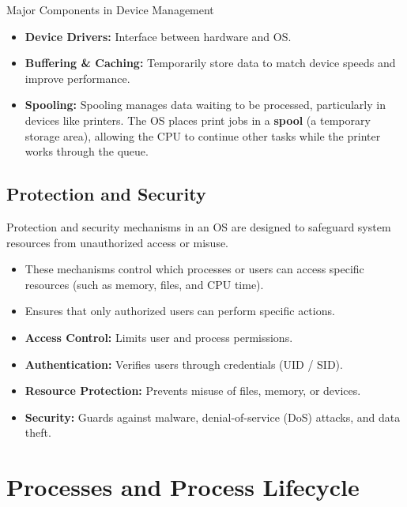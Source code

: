 \documentclass[10pt,a4paper]{article}
\begin{document}
\begin{conceptcard}{Major Components in Device Management}
\begin{itemize}
    \item \textbf{Device Drivers:} Interface between hardware and OS.
    \item \textbf{Buffering \& Caching:} Temporarily store data to match device speeds and improve performance.
    \item \textbf{Spooling:} Spooling manages data waiting to be processed, particularly in devices like printers. The OS places print jobs in a \textbf{spool} (a temporary storage area), allowing the CPU to continue other tasks while the printer works through the queue.
\end{itemize}
\end{conceptcard}

\subsection{Protection and Security}
Protection and security mechanisms in an OS are designed to safeguard system resources from unauthorized access or misuse.
\begin{itemize}
    \item These mechanisms control which processes or users can access specific resources (such as memory, files, and CPU time).
    \item Ensures that only authorized users can perform specific actions.
    \item \textbf{Access Control:} Limits user and process permissions.
    \item \textbf{Authentication:} Verifies users through credentials (UID / SID).
    \item \textbf{Resource Protection:} Prevents misuse of files, memory, or devices.
    \item \textbf{Security:} Guards against malware, denial-of-service (DoS) attacks, and data theft.
\end{itemize}

\clearpage
\section{Processes and Process Lifecycle}
\end{document}
